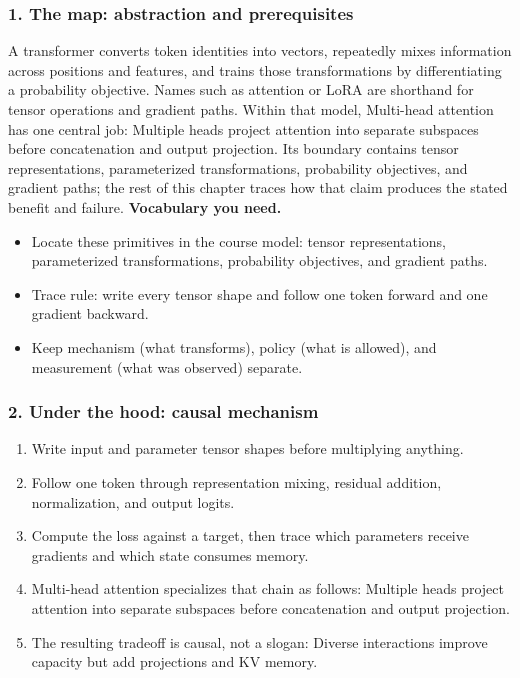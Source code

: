 \subsubsection*{1. The map: abstraction and prerequisites}
A transformer converts token identities into vectors, repeatedly mixes information across positions and features, and trains those transformations by differentiating a probability objective. Names such as attention or LoRA are shorthand for tensor operations and gradient paths.
Within that model, Multi-head attention has one central job: Multiple heads project attention into separate subspaces before concatenation and output projection. Its boundary contains tensor representations, parameterized transformations, probability objectives, and gradient paths; the rest of this chapter traces how that claim produces the stated benefit and failure.
\textbf{Vocabulary you need.}\begin{itemize}
\item Locate these primitives in the course model: tensor representations, parameterized transformations, probability objectives, and gradient paths.
\item Trace rule: write every tensor shape and follow one token forward and one gradient backward.
\item Keep mechanism (what transforms), policy (what is allowed), and measurement (what was observed) separate.
\end{itemize}
\subsubsection*{2. Under the hood: causal mechanism}\begin{enumerate}
\item Write input and parameter tensor shapes before multiplying anything.
\item Follow one token through representation mixing, residual addition, normalization, and output logits.
\item Compute the loss against a target, then trace which parameters receive gradients and which state consumes memory.
\item Multi-head attention specializes that chain as follows: Multiple heads project attention into separate subspaces before concatenation and output projection.
\item The resulting tradeoff is causal, not a slogan: Diverse interactions improve capacity but add projections and KV memory.
\end{enumerate}
